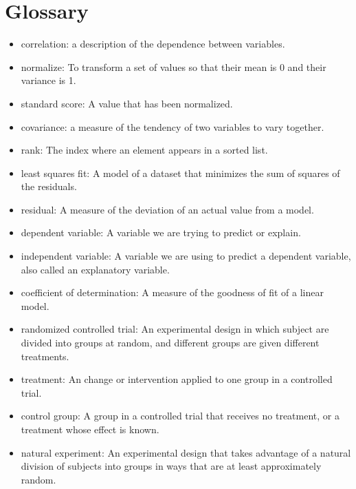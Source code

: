 \documentclass[12pt]{book}
\begin{document}
\section{Glossary}

\begin{itemize}

\item correlation: a description of the dependence between variables.

\item normalize: To transform a set of values so that their mean is 0 and
their variance is 1.

\item standard score: A value that has been normalized.

\item covariance: a measure of the tendency of two variables
to vary together.

\item rank: The index where an element appears in a sorted list.

\item least squares fit: A model of a dataset that minimizes the
sum of squares of the residuals.

\item residual: A measure of the deviation of an actual value from a model.

\item dependent variable: A variable we are trying to predict or explain.

\item independent variable: A variable we are using to predict a dependent
variable, also called an explanatory variable.

\item coefficient of determination: A measure of the goodness of fit
of a linear model.

\item randomized controlled trial: An experimental design in which subject
are divided into groups at random, and different groups are given different
treatments.

\item treatment: An change or intervention applied to one group in a
controlled trial.

\item control group: A group in a controlled trial that receives no
treatment, or a treatment whose effect is known.

\item natural experiment: An experimental design that takes advantage of
a natural division of subjects into groups in ways that are at least
approximately random.

\end{itemize}
\end{document}
